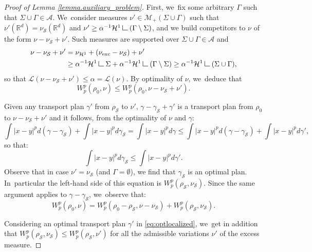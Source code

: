 \documentclass[JEP,XML,SOM,Unicode,NoFloatCountersInSection,published]{cedram}
\theoremstyle{definition}
\newcommand\LM[1]{\hbox{\vrule width.5pt \vbox to#1pt{\vfill \hrule width#1pt height.5pt}}}
\newcommand\LL{{\mathchoice {\>\LM7\>}{\>\LM7\>}{\,\LM5\,}{\,\LM{3.35}\,}}}
\newcommand{\mres}{\LL}
\newcommand\cH{\mathcal{H}}
\newcommand\cL{\mathcal{L}}
\newcommand{\RR}{\mathbb{R}}
\newcommand{\nuexc}{\nu_{\textup{exc}}}
\newcommand{\nuH}{\nu_{\cH^1}}
\begin{document}
\begin{proof}[Proof of Lemma \ref{lemma.auxiliary_problem}]
First, we~fix some arbitrary $\Gamma$ such that $\Sigma \cup \Gamma \in \mathcal{A}$. We~consider measures $\nu' \in \mathcal{M}_+(\Sigma\cup \Gamma)$ such that $\nu'(\RR^d) = \nu_{\mathcal{S}}(\RR^d)$ and $\nu' \ge \alpha^{-1}\mathcal{H}^1\mres (\Gamma\setminus \Sigma)$, and we build competitors to $\nu$ of the form $\nu - \nu_{\mathcal{S}} + \nu'$. Such measures are supported over $\Sigma \cup \Gamma \in \mathcal{A}$ and
\begin{align*}
\nu - \nu_{\mathcal{S}} + \nu'
&=
\nuH + (\nuexc - \nu_{\mathcal{S}}) + \nu'\\
&\ge
\alpha^{-1}\cH^1\mres \Sigma + \alpha^{-1}\cH^1\mres (\Gamma\setminus \Sigma)
\ge \alpha^{-1}\cH^1\mres (\Sigma \cup \Gamma),
\end{align*}
so that $\cL(\nu - \nu_{\mathcal{S}} + \nu') \le \alpha =\cL(\nu)$. By optimality of $\nu$, we~deduce that
\begin{equation*}
W_p^p(\rho_0, \nu) \le W_p^p(\rho_0, \nu - \nu_{\mathcal{S}} + \nu').
\end{equation*}

Given any transport plan $\gamma'$ from
$\rho_{\mathcal{S}}$ to $\nu'$, $\gamma-\gamma_{\mathcal{S}}+\gamma'$
is a transport plan from $\rho_0$ to $\nu - \nu_{\mathcal{S}} + \nu'$
and it follows, from the optimality of $\nu$ and $\gamma$:
\[
\int |x-y|^p d(\gamma-\gamma_{\mathcal S}) + \int |x-y|^p d\gamma_{\mathcal S} = \int |x-y|^p d\gamma
\le
\int |x-y|^p d(\gamma-\gamma_{\mathcal S}) + \int |x-y|^p d\gamma',
\]
so that:
\begin{equation}\label{eq:optlocalized}
\int |x-y|^p d\gamma_{\mathcal S}\le \int |x-y|^p d\gamma'.
\end{equation}
Observe that in case $\nu'=\nu_{\mathcal{S}}$ (and $\Gamma=\emptyset$),
we find that
$\gamma_{\mathcal{S}}$ is an optimal plan.
In~particular the left-hand side of this equation
is $W_p^p(\rho_{\mathcal{S}}, \nu_{\mathcal{S}})$.
Since the same argument applies to $\gamma-\gamma_{\mathcal{S}}$, we~observe
that:
\begin{equation}\label{rhoexc_decomposition_finer}
W_p^p(\rho_0, \nu)
=
W_p^p\left(\rho_0 - \rho_{\mathcal{S}}, \nu -\nu_{\mathcal{S}}\right)
+ W_p^p(\rho_{\mathcal{S}},\nu_{\mathcal{S}}).
\end{equation}

Considering an optimal transport plan $\gamma'$ in
\eqref{eq:optlocalized}, we~get in addition that $W_p^p\left(\rho_{\mathcal{S}}, \nu_{\mathcal{S}}\right) \le W_p^p\left(\rho_{\mathcal{S}}, \nu'\right)$
for all the admissible variations $\nu'$ of the excess measure.


\end{proof}
\end{document}
